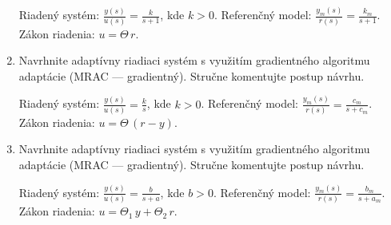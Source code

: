 \documentclass[a4paper, 10pt, ]{article}
\begin{document}
\begin{enumerate}[leftmargin=0pt, labelsep=4mm, itemsep=0pt]
	Riadený systém: $\displaystyle \frac{y(s)}{u(s)} = \frac{k}{s + 1}$, kde $k>0$. Referenčný model: $\displaystyle \frac{y_m(s)}{r(s)} = \frac{k_m}{s + 1}$. Zákon riadenia: $u = \Theta\,r$.


	\item Navrhnite adaptívny riadiaci systém s využitím gradientného algoritmu adaptácie (MRAC --- gradientný). Stručne komentujte postup návrhu.

	Riadený systém: $\displaystyle \frac{y(s)}{u(s)} = \frac{k}{s}$, kde $k>0$. Referenčný model: $\displaystyle \frac{y_m(s)}{r(s)} = \frac{c_m}{s + c_m}$. Zákon riadenia: $u = \Theta\,(r - y)$.



	\item Navrhnite adaptívny riadiaci systém s využitím gradientného algoritmu adaptácie (MRAC --- gradientný). Stručne komentujte postup návrhu.

	Riadený systém: $\displaystyle \frac{y(s)}{u(s)} = \frac{b}{s + a}$, kde $b>0$. Referenčný model: $\displaystyle \frac{y_m(s)}{r(s)} = \frac{b_m}{s + a_m}$. Zákon riadenia: $u = \Theta_1 \, y + \Theta_2 \, r$.

\end{enumerate}
\end{document}

